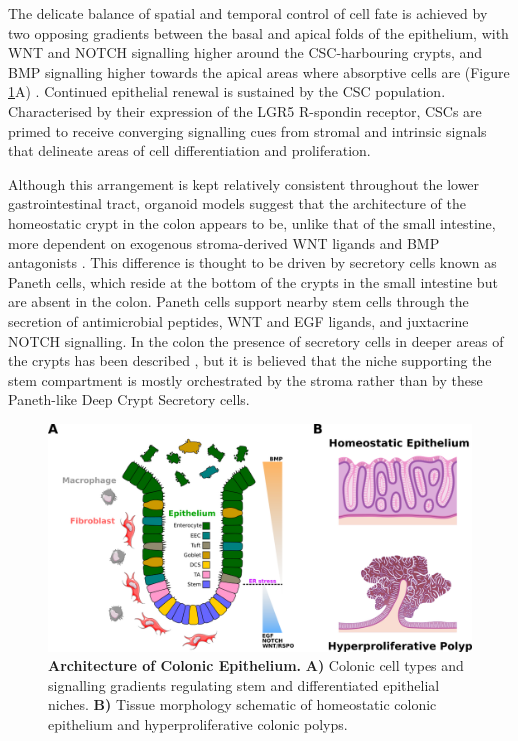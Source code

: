 The delicate balance of spatial and temporal control of cell fate is achieved by two opposing gradients between the basal and apical folds of the epithelium, with WNT and NOTCH signalling higher around the CSC-harbouring crypts, and BMP signalling higher towards the apical areas where absorptive cells are (Figure \ref{fig:1epi}A) \cite{bonis_intestinal_2021, beumer_cell_2021}. Continued epithelial renewal is sustained by the CSC population. Characterised by their expression of the LGR5 R-spondin receptor, CSCs are primed to receive converging signalling cues from stromal and intrinsic signals that delineate areas of cell differentiation and proliferation. 

Although this arrangement is kept relatively consistent throughout the lower gastrointestinal tract, organoid models suggest that the architecture of the homeostatic crypt in the colon appears to be, unlike that of the small intestine, more dependent on exogenous stroma-derived WNT ligands and BMP antagonists \cite{sato_long-term_2011, kondo_emerging_2019}. This difference is thought to be driven by secretory cells known as Paneth cells, which reside at the bottom of the crypts in the small intestine but are absent in the colon. Paneth cells support nearby stem cells through the secretion of antimicrobial peptides, WNT and EGF ligands, and juxtacrine NOTCH signalling. In the colon the presence of secretory cells in deeper areas of the crypts has been described \cite{sasaki_reg4_2016}, but it is believed that the niche supporting the stem compartment is mostly orchestrated by the stroma rather than by these Paneth-like Deep Crypt Secretory cells.

\begin{figure}[H]
    \centering
    \includegraphics{01intro/figs/1BIO_gutepithelia.png}
    \caption{\textbf{Architecture of Colonic Epithelium.} \textbf{A)} Colonic cell types and signalling gradients regulating stem and differentiated epithelial niches. \textbf{B)} Tissue morphology schematic of homeostatic colonic epithelium and hyperproliferative colonic polyps.}
    \label{fig:1epi}
\end{figure}

